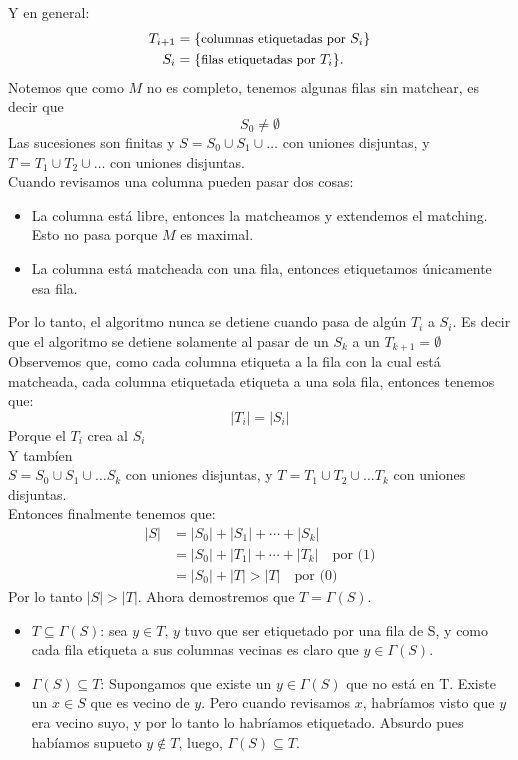 \documentclass[11pt, a4paper]{article}
\theoremstyle{definition}
\begin{document}
Y en general:
\begin{align*}
    T_{i+1} & = \{\text{\small columnas etiquetadas por }S_i\} \\
    S_i & = \{\text{\small filas etiquetadas por } T_i\}.
    \end{align*}
Notemos que como $M$ no es completo, tenemos algunas filas sin matchear, es decir que
\[S_0 \ne \emptyset \tag{0}\]
Las sucesiones son finitas y $S=S_0 \cup S_1 \cup \ldots$ con uniones disjuntas, y $T=T_1 \cup T_2 \cup \ldots$ con uniones disjuntas.\\
Cuando revisamos una columna pueden pasar dos cosas:
\begin{itemize}
    \item La columna está libre, entonces la matcheamos y extendemos el matching. Esto no pasa porque $M$ es maximal.
    \item La columna está matcheada con una fila, entonces etiquetamos únicamente esa fila.
\end{itemize}
Por lo tanto, el algoritmo nunca se detiene cuando pasa de algún $T_i$ a $S_i$. Es decir que el algoritmo se detiene solamente al pasar de un $S_k$ a un $T_{k+1}=\emptyset$\\
Observemos que, como cada columna etiqueta a la fila con la cual está matcheada, cada columna etiquetada etiqueta a una sola fila, entonces tenemos que:
\[|T_i|=|S_i| \tag{1}\]
Porque el $T_i$ crea al $S_i$\\ 
Y tambíen\\ 
$S=S_0 \cup S_1 \cup \ldots S_k$ con uniones disjuntas, y $T=T_1 \cup T_2 \cup \ldots T_k$ con uniones disjuntas.\\ 
Entonces finalmente tenemos que:
\begin{align*}
    |S| & = |S_0| + |S_1| + \cdots + |S_k| \\
        & = |S_0| + |T_1| + \cdots + |T_k| \quad\text{por (1)} \\
        & = |S_0| + |T| > |T| \quad\text{por (0)} 
\end{align*}
Por lo tanto $|S| > |T|$. Ahora demostremos que $T=\Gamma(S)$.
\begin{itemize}
    \item \(T \subseteq \Gamma(S)\): sea \(y \in T\), \(y\) tuvo que ser etiquetado por una fila de S, y como cada fila etiqueta a sus columnas vecinas es claro que \({y \in \Gamma(S).}\)
    \item \(\Gamma(S) \subseteq T\): Supongamos que existe un \(y \in \Gamma(S)\) que no está en T. Existe un \({x \in S}\) que es vecino de \(y\). Pero cuando revisamos \(x\), habríamos visto que \(y\) era vecino suyo, y por lo tanto lo habríamos etiquetado. Absurdo pues habíamos supueto \({y \not\in T}\), luego, \({\Gamma(S) \subseteq T.}\)
\end{itemize}
    
\end{document}
